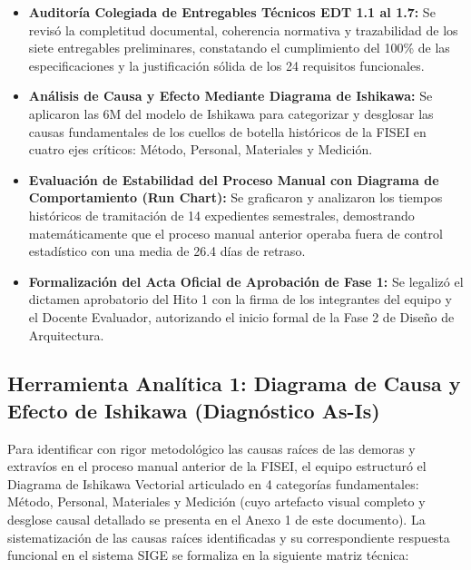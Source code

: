 \documentclass[12pt,a4paper]{article}
\begin{document}
\begin{itemize}[leftmargin=1.5em, itemsep=4pt]
    \item \textbf{Auditoría Colegiada de Entregables Técnicos EDT 1.1 al 1.7:} Se revisó la completitud documental, coherencia normativa y trazabilidad de los siete entregables preliminares, constatando el cumplimiento del 100\% de las especificaciones y la justificación sólida de los 24 requisitos funcionales.
    \item \textbf{Análisis de Causa y Efecto Mediante Diagrama de Ishikawa:} Se aplicaron las 6M del modelo de Ishikawa para categorizar y desglosar las causas fundamentales de los cuellos de botella históricos de la FISEI en cuatro ejes críticos: Método, Personal, Materiales y Medición.
    \item \textbf{Evaluación de Estabilidad del Proceso Manual con Diagrama de Comportamiento (Run Chart):} Se graficaron y analizaron los tiempos históricos de tramitación de 14 expedientes semestrales, demostrando matemáticamente que el proceso manual anterior operaba fuera de control estadístico con una media de 26.4 días de retraso.
    \item \textbf{Formalización del Acta Oficial de Aprobación de Fase 1:} Se legalizó el dictamen aprobatorio del Hito 1 con la firma de los integrantes del equipo y el Docente Evaluador, autorizando el inicio formal de la Fase 2 de Diseño de Arquitectura.
\end{itemize}

\subsection{Herramienta Analítica 1: Diagrama de Causa y Efecto de Ishikawa (Diagnóstico As-Is)}
Para identificar con rigor metodológico las causas raíces de las demoras y extravíos en el proceso manual anterior de la FISEI, el equipo estructuró el Diagrama de Ishikawa Vectorial articulado en 4 categorías fundamentales: Método, Personal, Materiales y Medición (cuyo artefacto visual completo y desglose causal detallado se presenta en el Anexo 1 de este documento). La sistematización de las causas raíces identificadas y su correspondiente respuesta funcional en el sistema SIGE se formaliza en la siguiente matriz técnica:
\end{document}
